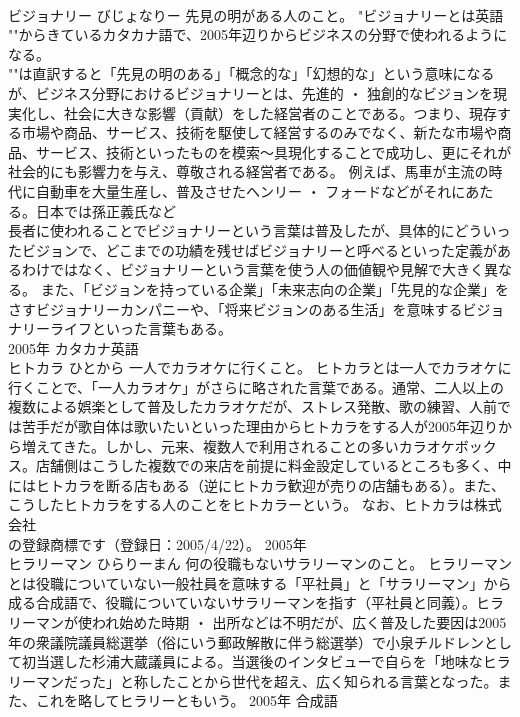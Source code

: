 \documentclass[8pt]{extreport}
\begin{document}
\begin{CJK}{UTF8}{min}
\\	ビジョナリー	びじょなりー	先見の明がある人のこと。	"ビジョナリーとは英語
\\	""からきているカタカナ語で、2005年辺りからビジネスの分野で使われるようになる。
\\	""は直訳すると「先見の明のある」「概念的な」「幻想的な」という意味になるが、ビジネス分野におけるビジョナリーとは、先進的 ・ 独創的なビジョンを現実化し、社会に大きな影響（貢献）をした経営者のことである。つまり、現存する市場や商品、サービス、技術を駆使して経営するのみでなく、新たな市場や商品、サービス、技術といったものを模索～具現化することで成功し、更にそれが社会的にも影響力を与え、尊敬される経営者である。 例えば、馬車が主流の時代に自動車を大量生産し、普及させたヘンリー ・ フォードなどがそれにあたる。日本では孫正義氏など
\\	長者に使われることでビジョナリーという言葉は普及したが、具体的にどういったビジョンで、どこまでの功績を残せばビジョナリーと呼べるといった定義があるわけではなく、ビジョナリーという言葉を使う人の価値観や見解で大きく異なる。 また、「ビジョンを持っている企業」「未来志向の企業」「先見的な企業」をさすビジョナリーカンパニーや、「将来ビジョンのある生活」を意味するビジョナリーライフといった言葉もある。
\\	2005年	カタカナ英語	
\\	ヒトカラ	ひとから	一人でカラオケに行くこと。	ヒトカラとは一人でカラオケに行くことで、「一人カラオケ」がさらに略された言葉である。通常、二人以上の複数による娯楽として普及したカラオケだが、ストレス発散、歌の練習、人前では苦手だが歌自体は歌いたいといった理由からヒトカラをする人が2005年辺りから増えてきた。しかし、元来、複数人で利用されることの多いカラオケボックス。店舗側はこうした複数での来店を前提に料金設定しているところも多く、中にはヒトカラを断る店もある（逆にヒトカラ歓迎が売りの店舗もある）。また、こうしたヒトカラをする人のことをヒトカラーという。 なお、ヒトカラは株式会社
\\	の登録商標です（登録日：2005/4/22）。	2005年	
\\	ヒラリーマン	ひらりーまん	何の役職もないサラリーマンのこと。	ヒラリーマンとは役職についていない一般社員を意味する「平社員」と「サラリーマン」から成る合成語で、役職についていないサラリーマンを指す（平社員と同義）。ヒラリーマンが使われ始めた時期 ・ 出所などは不明だが、広く普及した要因は2005年の衆議院議員総選挙（俗にいう郵政解散に伴う総選挙）で小泉チルドレンとして初当選した杉浦大蔵議員による。当選後のインタビューで自らを「地味なヒラリーマンだった」と称したことから世代を超え、広く知られる言葉となった。また、これを略してヒラリーともいう。	2005年	合成語	

\end{CJK}
\end{document}
